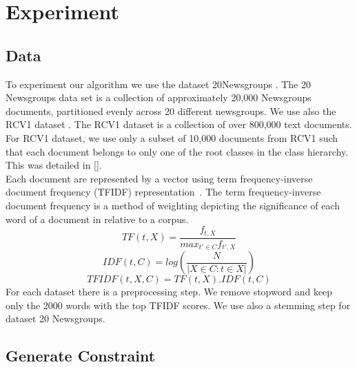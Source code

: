 \section{Experiment}

\subsection{Data}
To experiment our algorithm we use the dataset 20Newsgroups \cite{Newsgroups20}.
The 20 Newsgroups data set is a collection of approximately 20,000 Newsgroups 
documents, partitioned evenly across 20 different newsgroups. We use also the 
RCV1 dataset \cite{Lewis:2004:RNB:1005332.1005345}. The RCV1 dataset is a 
collection of over 800,000 text documents. For RCV1 dataset, we use only a 
subset of 10,000 documents from RCV1 such that each document belongs to only 
one of the root classes in the class hierarchy. This was detailed in 
[\cite{Deap-K-Means}].\\
Each document are represented by a vector using term frequency-inverse document 
frequency (TFIDF) representation~\cite{doi:10.1108/eb026526}.
The term frequency-inverse document frequency is a method of weighting depicting 
the significance of each word of a document in relative to a corpus.
\begin{equation}
TF(t, X) = \frac{f_{t, X}}{max_{t' \in C}f_{t', X}} 
\end{equation}
\begin{equation}
IDF(t, C) = log(\frac{N}{|X \in C : t \in X|})
\end{equation}
\begin{equation}
TFIDF(t,X,C) = TF(t, X) . IDF(t, C)   
\end{equation}
For each dataset there is a preprocessing step. We remove stopword and keep only
the 2000 words with the top TFIDF scores. We use also a stemming step 
\cite{journals/mtcl/Lovins68} for dataset 20 Newsgroups. 
\subsection{Generate Constraint}
